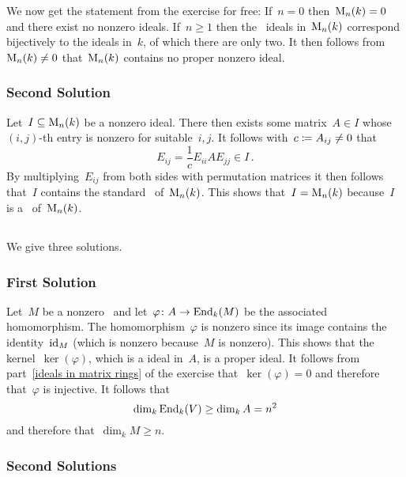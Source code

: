 We now get the statement from the exercise for free:
If~$n = 0$ then~$\operatorname{M}_{n}(k) = 0$ and there exist no nonzero {\twosided} ideals.
If~$n \geq 1$ then the~{\twosided} ideals in~$\operatorname{M}_{n}(k)$ correspond bijectively to the {\twosided} ideals in~$k$, of which there are only two.
It then follows from~$\operatorname{M}_{n}(k) \neq 0$ that~$\operatorname{M}_{n}(k)$ contains no proper nonzero ideal.



\subsubsection{Second Solution}

Let~$I \subseteq \operatorname{M}_{n}(k)$ be a nonzero {\twosided} ideal.
There then exists some matrix~$A \in I$ whose~$(i,j)$-th entry is nonzero for suitable~$i,j$.
It follows with~$c \coloneqq A_{ij} \neq 0$ that
\[
      E_{ij}
  =   \frac{1}{c} E_{ii} A E_{jj}
  \in I \,.
\]
By multiplying~$E_{ij}$ from both sides with permutation matrices it then follows that~$I$ contains the standard~{\kbasis} of~$\operatorname{M}_{n}(k)$.
This shows that~$I = \operatorname{M}_{n}(k)$ because~$I$ is a~{} of~$\operatorname{M}_{n}(k)$.





\subsection{}

We give three solutions.



\subsubsection{First Solution}

Let~$M$ be a nonzero~{} and let~$\varphi \colon A \to  \operatorname{End}_k(M)$ be the associated {\kalg} homomorphism.
The homomorphism~$\varphi$ is nonzero since its image contains the identity~$\operatorname{id}_M$ (which is nonzero because~$M$ is nonzero).
This shows that the kernel~$\ker(\varphi)$, which is a {\twosided} ideal in~$A$, is a proper ideal.
It follows from part~\ref{ideals in matrix rings} of the exercise that~$\ker(\varphi) = 0$ and therefore that~$\varphi$ is injective.
It follows that
\[
        \dim_k  \operatorname{End}_k(V)
  \geq  \dim_k  A
  =             n^2
\]
and therefore that~$\dim_k M \geq n$.



\subsubsection{Second Solutions}

